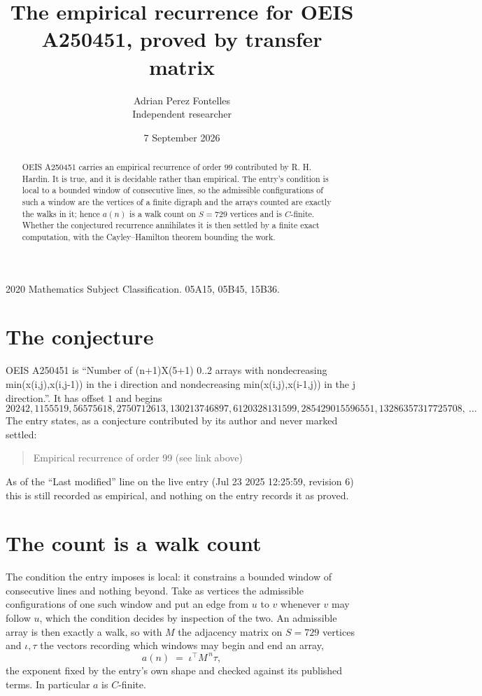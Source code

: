 \documentclass[11pt,a4paper]{article}
\title{The empirical recurrence for OEIS A250451, proved by transfer matrix}
\author{Adrian Perez Fontelles\\ \small Independent researcher}
\date{7 September 2026}
\theoremstyle{plain}
\theoremstyle{definition}
\begin{document}
\maketitle

\begin{abstract}
OEIS A250451 carries an empirical recurrence of order $99$ contributed by R. H. Hardin. It is
true, and it is decidable rather than empirical. The entry's condition is local to a bounded window of consecutive lines, so
the admissible configurations of such a window are the vertices of a finite digraph and the
arrays counted are exactly the walks in it; hence $a(n)$ is a walk count on $S=729$ vertices
and is $C$-finite. Whether the conjectured recurrence annihilates it is then settled by a
finite exact computation, with the Cayley--Hamilton theorem bounding the work.
\end{abstract}

\noindent\small 2020 Mathematics Subject Classification. 05A15, 05B45, 15B36.\normalsize

\section{The conjecture}

OEIS A250451 is ``Number of (n+1)X(5+1) 0..2 arrays with nondecreasing min(x(i,j),x(i,j-1)) in the i direction and nondecreasing min(x(i,j),x(i-1,j)) in the j direction.''. It has offset $1$ and begins
\[
20242, 1155519, 56575618, 2750712613, 130213746897, 6120328131599, 285429015596551, 13286357317725708,\ \dots
\]
The entry states, as a conjecture contributed by its author and never marked settled:
\begin{quote}
Empirical recurrence of order 99 (see link above)
\end{quote}
As of the ``Last modified'' line on the live entry (Jul 23 2025 12:25:59, revision 6) this is still
recorded as empirical, and nothing on the entry records it as proved.

\section{The count is a walk count}

The condition the entry imposes is local: it constrains a bounded window of consecutive lines and nothing beyond. Take as
vertices the admissible configurations of one such window and put an edge from $u$ to $v$
whenever $v$ may follow $u$, which the condition decides by inspection of the two. An
admissible array is then exactly a walk, so with $M$ the adjacency matrix on $S=729$ vertices
and $\iota,\tau$ the vectors recording which windows may begin and end an array,
\[
a(n)\;=\;\iota^{\!\top}M^{\,n}\tau ,
\]
the exponent fixed by the entry's own shape and checked against its published terms. In
particular $a$ is $C$-finite.
\end{document}
